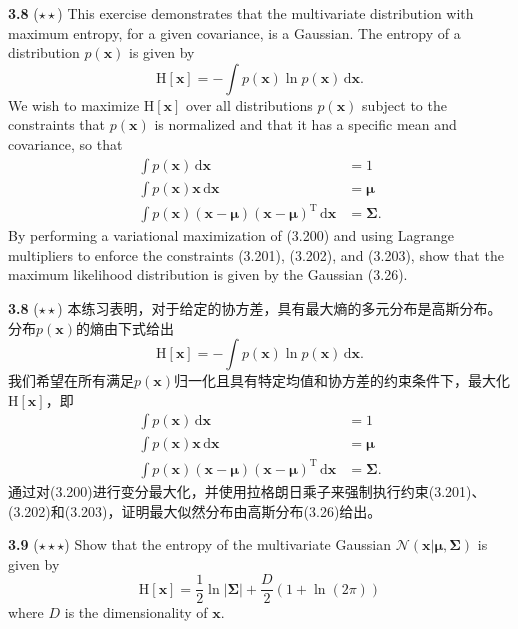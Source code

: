 \documentclass{article}
\begin{document}
\textbf{3.8} ($\star\star$) This exercise demonstrates that the multivariate distribution with maximum entropy, for a given covariance, is a Gaussian. The entropy of a distribution $p(\mathbf{x})$ is given by
\begin{equation}
\mathrm{H}[\mathbf{x}] = - \int p(\mathbf{x}) \ln p(\mathbf{x}) \,\mathrm{d}\mathbf{x}. \tag{3.200}
\end{equation}
We wish to maximize $\mathrm{H}[\mathbf{x}]$ over all distributions $p(\mathbf{x})$ subject to the constraints that $p(\mathbf{x})$ is normalized and that it has a specific mean and covariance, so that
\begin{align}
\int p(\mathbf{x}) \,\mathrm{d}\mathbf{x} &= 1 \tag{3.201} \\
\int p(\mathbf{x}) \mathbf{x} \,\mathrm{d}\mathbf{x} &= \boldsymbol{\mu} \tag{3.202} \\
\int p(\mathbf{x}) (\mathbf{x}-\boldsymbol{\mu})(\mathbf{x}-\boldsymbol{\mu})^\mathrm{T} \,\mathrm{d}\mathbf{x} &= \boldsymbol{\Sigma}. \tag{3.203}
\end{align}
By performing a variational maximization of (3.200) and using Lagrange multipliers to enforce the constraints (3.201), (3.202), and (3.203), show that the maximum likelihood distribution is given by the Gaussian (3.26).

\textbf{3.8} ($\star\star$) 本练习表明，对于给定的协方差，具有最大熵的多元分布是高斯分布。分布$p(\mathbf{x})$的熵由下式给出
\begin{equation}
\mathrm{H}[\mathbf{x}] = - \int p(\mathbf{x}) \ln p(\mathbf{x}) \,\mathrm{d}\mathbf{x}. \tag{3.200}
\end{equation}
我们希望在所有满足$p(\mathbf{x})$归一化且具有特定均值和协方差的约束条件下，最大化$\mathrm{H}[\mathbf{x}]$，即
\begin{align}
\int p(\mathbf{x}) \,\mathrm{d}\mathbf{x} &= 1 \tag{3.201} \\
\int p(\mathbf{x}) \mathbf{x} \,\mathrm{d}\mathbf{x} &= \boldsymbol{\mu} \tag{3.202} \\
\int p(\mathbf{x}) (\mathbf{x}-\boldsymbol{\mu})(\mathbf{x}-\boldsymbol{\mu})^\mathrm{T} \,\mathrm{d}\mathbf{x} &= \boldsymbol{\Sigma}. \tag{3.203}
\end{align}
通过对(3.200)进行变分最大化，并使用拉格朗日乘子来强制执行约束(3.201)、(3.202)和(3.203)，证明最大似然分布由高斯分布(3.26)给出。

\textbf{3.9} ($\star\star\star$) Show that the entropy of the multivariate Gaussian $\mathcal{N}(\mathbf{x}|\boldsymbol{\mu}, \boldsymbol{\Sigma})$ is given by
\begin{equation}
\mathrm{H}[\mathbf{x}] = \frac{1}{2} \ln |\boldsymbol{\Sigma}| + \frac{D}{2} (1 + \ln(2\pi)) \tag{3.204}
\end{equation}
where $D$ is the dimensionality of $\mathbf{x}$.
\end{document}
